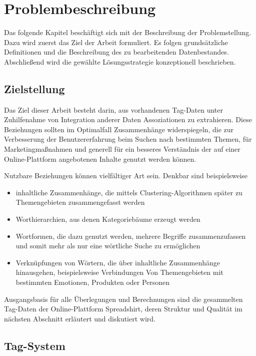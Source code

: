 \chapter{Problembeschreibung}

Das folgende Kapitel beschäftigt sich mit der Beschreibung der Problemstellung. Dazu wird zuerst das Ziel der Arbeit formuliert. Es folgen grundsätzliche Definitionen und die Beschreibung des zu bearbeitenden Datenbestandes. Abschließend wird die gewählte Lösungsstrategie konzeptionell beschrieben.

\section{Zielstellung}

Das Ziel dieser Arbeit besteht darin, aus vorhandenen Tag-Daten unter Zuhilfenahme von Integration anderer Daten Assoziationen zu extrahieren. Diese Beziehungen sollten im Optimalfall Zusammenhänge widerspiegeln, die zur Verbesserung der Benutzererfahrung beim Suchen nach bestimmten Themen, für Marketingmaßnahmen und generell für ein besseres Verständnis der auf einer Online-Plattform angebotenen Inhalte genutzt werden können.

Nutzbare Beziehungen können vielfältiger Art sein. Denkbar sind beispielsweise

\begin{itemize}
    \item inhaltliche Zusammenhänge, die mittels Clustering-Algorithmen später zu Themengebieten zusammengefasst werden
    \item Worthierarchien, aus denen Kategoriebäume erzeugt werden
    \item Wortformen, die dazu genutzt werden, mehrere Begriffe zusammenzufassen und somit mehr als nur eine wörtliche Suche zu ermöglichen
    \item Verknüpfungen von Wörtern, die über inhaltliche Zusammenhänge hinausgehen, beispielsweise Verbindungen Von Themengebieten mit bestimmten Emotionen, Produkten oder Personen
\end{itemize}

Ausgangsbasis für alle Überlegungen und Berechnungen sind die gesammelten Tag-Daten der Online-Plattform Spreadshirt, deren Struktur und Qualität im nächsten Abschnitt erläutert und diskutiert wird.

\section{Tag-System}
\label{data}

